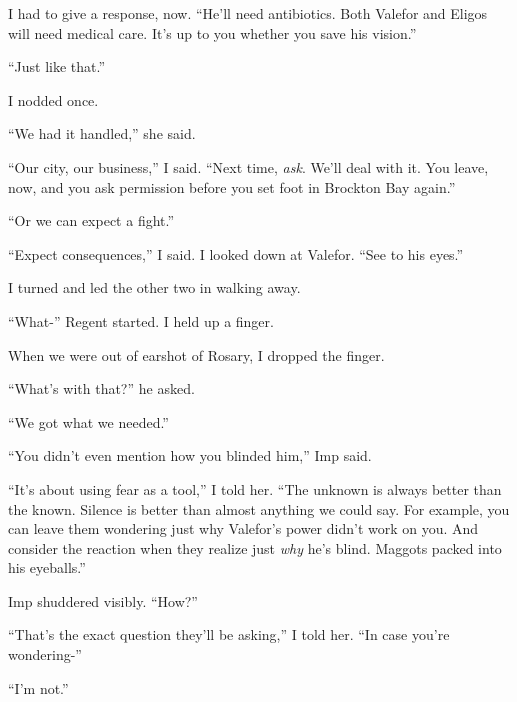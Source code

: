 I had to give a response, now.  ``He'll need antibiotics.  Both Valefor and Eligos will need medical care.  It's up to you whether you save his vision.''



``Just like that.''



I nodded once.



``We had it handled,'' she said.



``Our city, our business,'' I said.  ``Next time, \emph{ask}.  We'll deal with it.  You leave, now, and you ask permission before you set foot in Brockton Bay again.''



``Or we can expect a fight.''



``Expect consequences,'' I said.  I looked down at Valefor.  ``See to his eyes.''



I turned and led the other two in walking away.



``What-'' Regent started.  I held up a finger.



When we were out of earshot of Rosary, I dropped the finger.



``What's with that?'' he asked.



``We got what we needed.''



``You didn't even mention how you blinded him,'' Imp said.



``It's about using fear as a tool,'' I told her.  ``The unknown is always better than the known.  Silence is better than almost anything we could say.  For example, you can leave them wondering just why Valefor's power didn't work on you.  And consider the reaction when they realize just \emph{why} he's blind.  Maggots packed into his eyeballs.''



Imp shuddered visibly.  ``How?''



``That's the exact question they'll be asking,'' I told her.  ``In case you're wondering-''



``I'm not.''



